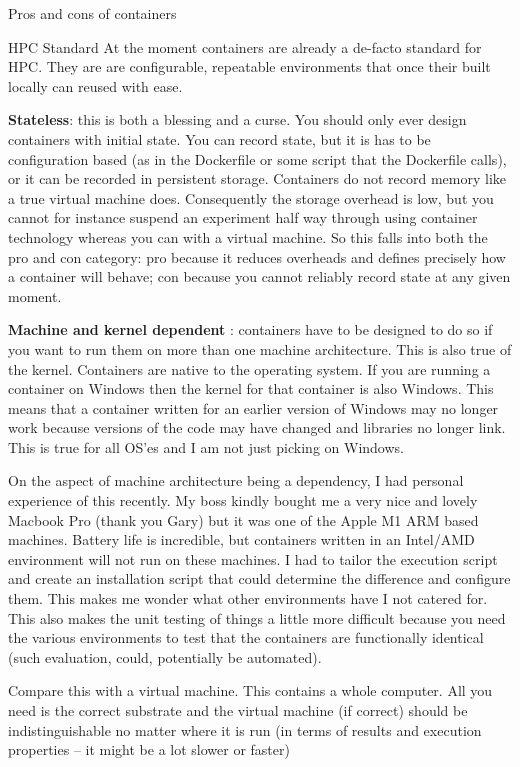 \documentclass[usenames,dvipsnames,10pt]{beamer}
\begin{document}
\begin{frame}{Pros and cons of containers}
{HPC Standard At the moment containers are already a de-facto standard for HPC. They are are configurable, repeatable environments that once their built locally can reused with ease.

    \textbf{Stateless}: this is both a blessing and a curse. You should only ever design containers with initial state. You can record state, but it is has to be configuration based (as in the Dockerfile  or some script that the Dockerfile calls), or it can be recorded in persistent storage. Containers do not record memory like a true virtual machine does. Consequently the storage overhead is low, but you cannot for instance suspend an experiment half way through using container technology whereas you can with a virtual machine.  So this falls into both the pro and con category: pro because it reduces overheads and defines precisely how a container will behave; con because you cannot reliably record state at any given moment.

    \textbf{Machine and kernel dependent} : containers have to be designed to do so if you want to run them on more than one machine architecture. This is also true of the kernel. Containers are native to the operating system. If you are running a container on Windows then the kernel for that container is also Windows. This means that a container written for an earlier version of Windows may no longer work because versions of the code may have changed and libraries no longer link. This is true for all OS’es and I am not just picking on Windows.

On the aspect of machine architecture being a dependency, I had personal experience of this recently. My boss kindly bought me a very nice and lovely Macbook Pro (thank you Gary) but it was one of the Apple M1 ARM based machines. Battery life is incredible, but containers written in an Intel/AMD environment will not run on these machines. I had to tailor the execution script and create an installation script that could determine the difference and configure them. This makes me wonder what other environments have  I not catered for. This also makes the unit testing of things a little more difficult because you need the various environments to test that the containers are functionally identical (such evaluation, could, potentially be automated).

Compare this with a virtual machine. This contains a whole computer. All you need is the correct substrate and the virtual machine (if correct) should be indistinguishable no matter where it is run (in terms of results and execution properties – it might be a lot slower or faster)

}
\end{frame}
\end{document}
